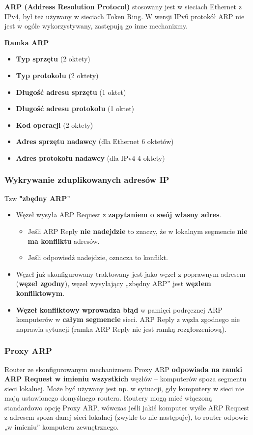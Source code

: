 \documentclass[../main.tex]{subfiles}
\begin{document}
    \textbf{ARP (Address Resolution Protocol)} stosowany jest w sieciach Ethernet z IPv4, był też używany w sieciach Token Ring.
    W wersji IPv6 protokół ARP nie jest w ogóle wykorzystywany, zastępują go inne mechanizmy.

    \textbf{Ramka ARP}
    \begin{itemize}
        \item \textbf{Typ sprzętu} (2 oktety)
        \item \textbf{Typ protokołu} (2 oktety)
        \item \textbf{Długość adresu sprzętu} (1 oktet)
        \item \textbf{Długość adresu protokołu} (1 oktet)
        \item \textbf{Kod operacji} (2 oktety)
        \item \textbf{Adres sprzętu nadawcy} (dla Ethernet 6 oktetów)
        \item \textbf{Adres protokołu nadawcy} (dla IPv4 4 oktety)
    \end{itemize}

    \subsubsection{Wykrywanie zduplikowanych adresów IP}
    Tzw \textbf{"zbędny ARP"}
    \begin{itemize}
        \item Węzeł wysyła ARP Request z \textbf{zapytaniem o swój własny adres}.
        \begin{itemize}
            \item Jeśli ARP Reply \textbf{nie nadejdzie} to znaczy, że w lokalnym segmencie \textbf{nie ma konfliktu} adresów.
            \item Jeśli odpowiedź nadejdzie, oznacza to konflikt.
        \end{itemize}
        \item Węzeł już skonfigurowany traktowany jest jako węzeł z poprawnym adresem (\textbf{węzeł zgodny}), węzeł
        wysyłający „zbędny ARP” jest \textbf{węzłem konfliktowym}.
        \item \textbf{Węzeł konfliktowy wprowadza błąd} w pamięci podręcznej ARP komputerów w \textbf{całym segmencie} sieci. ARP Reply z węzła zgodnego nie naprawia sytuacji (ramka ARP Reply nie jest ramką rozgłoszeniową).
    \end{itemize}

    \subsubsection{Proxy ARP}
    Router ze skonfigurowanym mechanizmem Proxy ARP \textbf{odpowiada na ramki ARP Request w
    imieniu wszystkich} węzłów – komputerów spoza segmentu sieci lokalnej. Może
    być używany jest np. w sytuacji, gdy komputery w sieci nie mają ustawionego domyślnego
    routera. Routery mogą mieć włączoną standardowo
    opcję Proxy ARP, wówczas jeśli jakiś komputer wyśle ARP Request z adresem spoza danej
    sieci lokalnej (zwykle to nie następuje), to router odpowie „w imieniu” komputera
    zewnętrznego.
\end{document}
